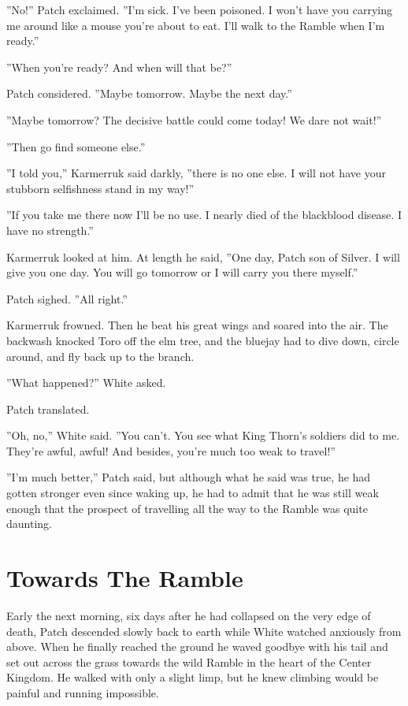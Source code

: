 \documentclass[12pt]{book}
\begin{document}
''No!'' Patch exclaimed. ''I'm sick. I've been poisoned. I won't have
you carrying me around like a mouse you're about to eat. I'll walk to
the Ramble when I'm ready.''

''When you're ready? And when will that be?''

Patch considered. ''Maybe tomorrow. Maybe the next day.''

''Maybe tomorrow? The decisive battle could come today! We dare not
wait!''

''Then go find someone else.''

''I told you,'' Karmerruk said darkly, ''there is no one else. I will
not have your stubborn selfishness stand in my way!''

''If you take me there now I'll be no use. I nearly died of the
blackblood disease. I have no strength.''

Karmerruk looked at him. At length he said, ''One day, Patch son of
Silver. I will give you one day. You will go tomorrow or I will carry
you there myself.''

Patch sighed. ''All right.''

Karmerruk frowned. Then he beat his great wings and soared into the
air. The backwash knocked Toro off the elm tree, and the bluejay had
to dive down, circle around, and fly back up to the branch.

''What happened?'' White asked.

Patch translated.

''Oh, no,'' White said. ''You can't. You see what King Thorn's
soldiers did to me. They're awful, awful! And besides, you're much too
weak to travel!''

''I'm much better,'' Patch said, but although what he said was true,
he had gotten stronger even since waking up, he had to admit that he
was still weak enough that the prospect of travelling all the way to
the Ramble was quite daunting.


\section{Towards The Ramble}

Early the next morning, six days after he had collapsed on the very
edge of death, Patch descended slowly back to earth while White
watched anxiously from above. When he finally reached the ground he
waved goodbye with his tail and set out across the grass towards the
wild Ramble in the heart of the Center Kingdom. He walked with only a
slight limp, but he knew climbing would be painful and running
impossible.
\end{document}
